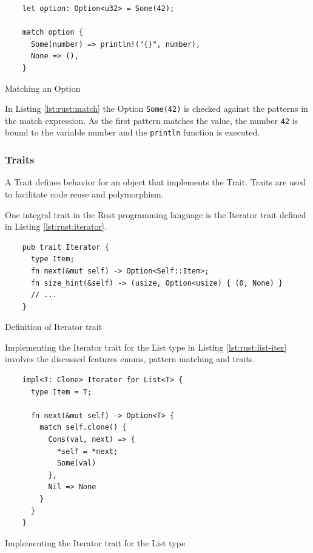 \begin{listing}[H]
  \begin{verbatim}
    let option: Option<u32> = Some(42);

    match option {
      Some(number) => println!("{}", number),
      None => (),
    }
  \end{verbatim}
  \caption{Matching an Option}
  \label{lst:rust:match}
\end{listing}

In Listing \ref{lst:rust:match} the Option \texttt{Some(42)} is checked against the patterns in the match expression.
As the first pattern matches the value, the number \texttt{42} is bound to the variable number and the \texttt{println} function is executed.

\subsubsection{Traits}

A Trait defines behavior for an object that implements the Trait.
Traits are used to facilitate code reuse and polymorphism.

One integral trait in the Rust programming language is the Iterator trait defined in Listing \ref{lst:rust:iterator}.

\begin{listing}[H]
  \begin{verbatim}
    pub trait Iterator {
      type Item;
      fn next(&mut self) -> Option<Self::Item>;
      fn size_hint(&self) -> (usize, Option<usize) { (0, None) }
      // ...
    }
  \end{verbatim}
  \caption{Definition of Iterator trait}
  \label{lst:rust:iterator}
\end{listing}

Implementing the Iterator trait for the List type in Listing \ref{lst:rust:list-iter} involves the discussed features enums, pattern matching and traits.

\begin{listing}[H]
  \begin{verbatim}
    impl<T: Clone> Iterator for List<T> {
      type Item = T;

      fn next(&mut self) -> Option<T> {
        match self.clone() {
          Cons(val, next) => {
            *self = *next;
            Some(val)
          },
          Nil => None
        }
      }
    }
  \end{verbatim}
  \caption{Implementing the Iterator trait for the List type}
  \label{lst:rust:list-iter}
\end{listing}


